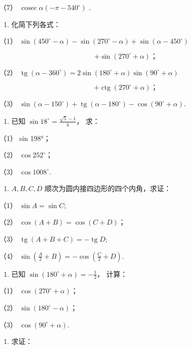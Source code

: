 （7） \(\operatorname{cosec}\alpha(-\pi-540^{\circ})\) .

\begin{enumerate}[start=4]
\item
  化简下列各式：
\end{enumerate}

（1）
\(\sin (450^{\circ} - \alpha) - \sin (270^{\circ} - \alpha) + \sin (\alpha - 450^{\circ})\)

\[
+ \sin (270 ^{\circ} + \alpha)\text{；}
\]

（2）
\(\operatorname{tg}(\alpha - 360^{\circ}) = 2\sin (180^{\circ} + \alpha)\sin (90^{\circ} + \alpha)\)

\[
+ \operatorname{ctg} (270 ^{\circ} + \alpha)\text{；}
\]

（3）
\(\sin (\alpha - 150^{\circ}) + \operatorname{tg} (\alpha - 180^{\circ}) - \cos (90^{\circ} + \alpha)\).

\begin{enumerate}[start=5]
\item
  已知 \(\sin 18^{\circ} = \frac{\sqrt{5} - 1}{4}\)， 求：
\end{enumerate}

（1） sin 198°；

（2） \(\cos 252^{\circ}\)；

（3） \(\cos 1008^{\circ}\).

\begin{enumerate}[start=6]
\item
  \(A, B, C, D\) 顺次为圆内接四边形的四个内角，求证：
\end{enumerate}

（1） \(\sin A = \sin C;\)

（2） \(\cos (A + B) = \cos (C + D)\)；

（3） \(\operatorname{tg}(A + B + C) = -\operatorname{tg} D;\)

（4）
\(\sin \left(\frac{A}{2} + B\right) = -\cos \left(\frac{C}{2} + D\right)\).

\begin{enumerate}[start=7]
\item
  已知 \(\sin (180^{\circ} + \alpha) = -\frac{1}{2}\)， 计算：
\end{enumerate}

（1） \(\cos (270^{\circ} + \alpha)\)；

（2） \(\sin (180^{\circ} - \alpha)\)；

（3） \(\cos (90^{\circ} + \alpha)\).

\begin{enumerate}[start=8]
\item
  求证：
\end{enumerate}

